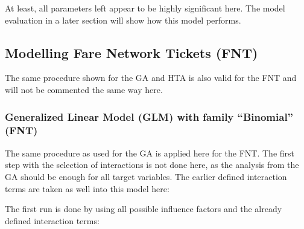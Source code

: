 \documentclass[
]{article}
\begin{document}
At least, all parameters left appear to be highly significant here. The
model evaluation in a later section will show how this model performs.

\hypertarget{modelling-fare-network-tickets-fnt}{%
\subsection{Modelling Fare Network Tickets
(FNT)}\label{modelling-fare-network-tickets-fnt}}

The same procedure shown for the GA and HTA is also valid for the FNT
and will not be commented the same way here.

\hypertarget{generalized-linear-model-glm-with-family-binomial-fnt}{%
\subsubsection{Generalized Linear Model (GLM) with family ``Binomial''
(FNT)}\label{generalized-linear-model-glm-with-family-binomial-fnt}}

The same procedure as used for the GA is applied here for the FNT. The
first step with the selection of interactions is not done here, as the
analysis from the GA should be enough for all target variables. The
earlier defined interaction terms are taken as well into this model
here:

The first run is done by using all possible influence factors and the
already defined interaction terms:
\end{document}
